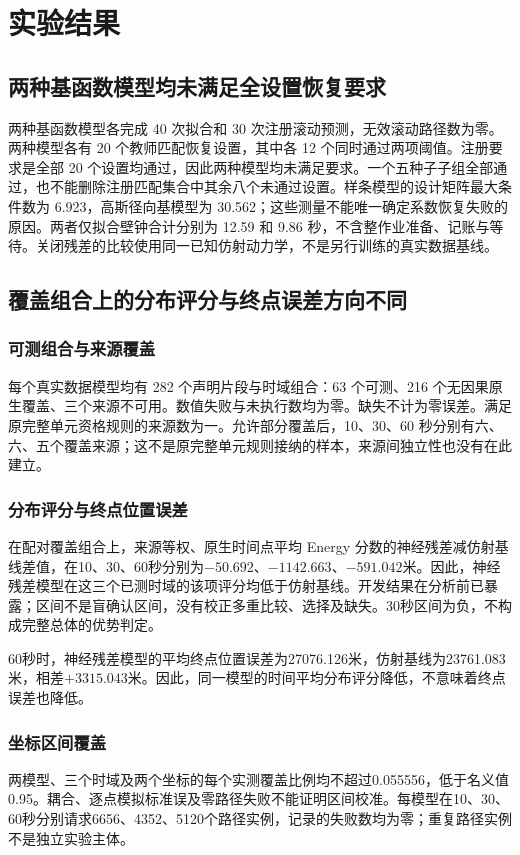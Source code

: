 \documentclass[UTF8,11pt]{ctexart}
\newcommand{\tabfile}[1]{\begin{center}\resizebox{\textwidth}{!}{}\end{center}}
\begin{document}
\section{实验结果}\label{sec:results}
\subsection{两种基函数模型均未满足全设置恢复要求}\label{sec:rq1}
\tabfile{m1-recovery.tex}
两种基函数模型各完成 40 次拟合和 30 次注册滚动预测，无效滚动路径数为零。两种模型各有 20 个教师匹配恢复设置，其中各 12 个同时通过两项阈值。注册要求是全部 20 个设置均通过，因此两种模型均未满足要求。一个五种子子组全部通过，也不能删除注册匹配集合中其余八个未通过设置。样条模型的设计矩阵最大条件数为 6.923，高斯径向基模型为 30.562；这些测量不能唯一确定系数恢复失败的原因。两者仅拟合壁钟合计分别为 12.59 和 9.86 秒，不含整作业准备、记账与等待。关闭残差的比较使用同一已知仿射动力学，不是另行训练的真实数据基线。

\subsection{覆盖组合上的分布评分与终点误差方向不同}\label{sec:rq2}
\subsubsection{可测组合与来源覆盖}
每个真实数据模型均有 282 个声明片段与时域组合：63 个可测、216 个无因果原生覆盖、三个来源不可用。数值失败与未执行数均为零。缺失不计为零误差。满足原完整单元资格规则的来源数为一。允许部分覆盖后，10、30、60 秒分别有六、六、五个覆盖来源；这不是原完整单元规则接纳的样本，来源间独立性也没有在此建立。

\subsubsection{分布评分与终点位置误差}
\tabfile{real-energy.tex}
在配对覆盖组合上，来源等权、原生时间点平均 Energy 分数的神经残差减仿射基线差值，在10、30、60秒分别为$-50.692$、$-1142.663$、$-591.042$米。因此，神经残差模型在这三个已测时域的该项评分均低于仿射基线。开发结果在分析前已暴露；区间不是盲确认区间，没有校正多重比较、选择及缺失。30秒区间为负，不构成完整总体的优势判定。

\tabfile{fde-mc.tex}
60秒时，神经残差模型的平均终点位置误差为27076.126米，仿射基线为23761.083米，相差$+3315.043$米。因此，同一模型的时间平均分布评分降低，不意味着终点误差也降低。

\subsubsection{坐标区间覆盖}
\tabfile{real-calibration.tex}
两模型、三个时域及两个坐标的每个实测覆盖比例均不超过0.055556，低于名义值0.95。耦合、逐点模拟标准误及零路径失败不能证明区间校准。每模型在10、30、60秒分别请求6656、4352、5120个路径实例，记录的失败数均为零；重复路径实例不是独立实验主体。
\end{document}
